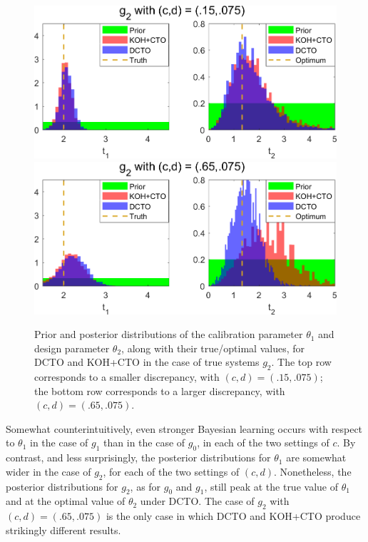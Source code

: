 \documentclass[12pt]{article}
\begin{document}
%
\begin{figure}
\centering
\includegraphics[scale=0.85]{FIG_KOHCTO_DCTO_comp_discrep3_results}
\includegraphics[scale=0.85]{FIG_KOHCTO_DCTO_comp_discrep4_results}
\captionsetup{width=.85\linewidth}
\caption{Prior and posterior distributions of the calibration parameter $\theta_1$ and design parameter $\theta_2$, along with their true/optimal values, for DCTO and KOH+CTO in the case of true systems $g_2$. The top row corresponds to a smaller discrepancy, with $(c,d)=(.15,.075)$; the bottom row corresponds to a larger discrepancy, with $(c,d)=(.65,.075)$.}
\label{fig:2_discrep_results}
\end{figure}
%
Somewhat counterintuitively, even stronger Bayesian learning occurs with respect to $\theta_1$ in the case of $g_1$ than in the case of $g_0$, in each of the two settings of $c$.
%
By contrast, and less surprisingly, the posterior distributions for $\theta_1$ are somewhat wider in the case of $g_2$, for each of the two settings of $(c,d)$.
%
Nonetheless, the posterior distributions for $g_2$, as for $g_0$ and $g_1$, still peak at the true value of $\theta_1$ and at the optimal value of $\theta_2$ under DCTO.
%
The case of $g_2$ with $(c,d)=(.65,.075)$ is the only case in which DCTO and KOH+CTO produce strikingly different results.
\end{document}
